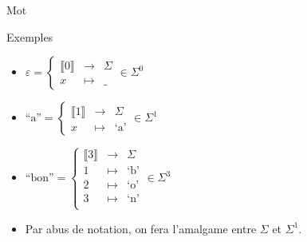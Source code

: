 \begin{frame}{Mot}
\begin{exampleblock}{Exemples}
    \begin{minipage}[t]{.5\textwidth}
      \begin{itemize}
      \item $\varepsilon = \left\{\begin{array}{ccc}
        \llbracket 0\rrbracket & \rightarrow & \Sigma\\
        x & \mapsto & \_
      \end{array}\right. \in \Sigma^0$
      \item $\text{``a''} = \left\{\begin{array}{ccc}
        \llbracket 1\rrbracket & \rightarrow & \Sigma\\
        x & \mapsto & \text{`a'}
      \end{array}\right. \in \Sigma^1$
      \end{itemize}
    \end{minipage}%
    \begin{minipage}[t]{.5\textwidth}
      \begin{itemize}
      \item $\text{``bon''} = \left\{\begin{array}{ccc}
        \llbracket 3\rrbracket& \rightarrow & \Sigma\\
        1 & \mapsto & \text{`b'}\\
        2 & \mapsto & \text{`o'}\\
        3 & \mapsto & \text{`n'}\\
      \end{array}\right. \in \Sigma^3$
      \end{itemize}
    \end{minipage}%
    \begin{itemize}
    \item Par abus de notation, on fera l'amalgame entre $\Sigma$ et $\Sigma^1$. 
    \end{itemize}
    
  \end{exampleblock}
\end{frame}

\endgroup
